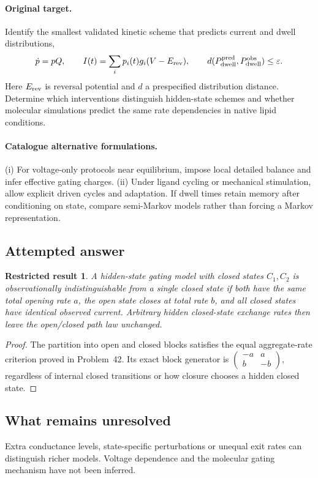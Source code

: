 \documentclass[11pt]{article}
\newtheorem{attemptresult}{Restricted result}[section]
\begin{document}
\paragraph{Original target.}
Identify the smallest validated kinetic scheme that predicts current and dwell distributions,
\[\dot p=pQ,\qquad I(t)=\sum_i p_i(t)g_i(V-E_{\rm rev}),\qquad d(P_{\rm dwell}^{\rm pred},P_{\rm dwell}^{\rm obs})\le\varepsilon.\]
Here $E_{\rm rev}$ is reversal potential and $d$ a prespecified distribution distance. Determine which interventions distinguish hidden-state schemes and whether molecular simulations predict the same rate dependencies in native lipid conditions.
\paragraph{Catalogue alternative formulations.}
(i) For voltage-only protocols near equilibrium, impose local detailed balance and infer effective gating charges. (ii) Under ligand cycling or mechanical stimulation, allow explicit driven cycles and adaptation. If dwell times retain memory after conditioning on state, compare semi-Markov models rather than forcing a Markov representation.
\subsection{Attempted answer}
\begin{attemptresult}
A hidden-state gating model with closed states $C_1,C_2$ is observationally indistinguishable from a single closed state if both have the same total opening rate $a$, the open state closes at total rate $b$, and all closed states have identical observed current. Arbitrary hidden closed-state exchange rates then leave the open/closed path law unchanged.
\end{attemptresult}
\begin{proof}
The partition into open and closed blocks satisfies the equal aggregate-rate criterion proved in Problem~42. Its exact block generator is $\left(\begin{smallmatrix}-a&a\\b&-b\end{smallmatrix}\right)$, regardless of internal closed transitions or how closure chooses a hidden closed state.
\end{proof}
\subsection{What remains unresolved}
Extra conductance levels, state-specific perturbations or unequal exit rates can distinguish richer models. Voltage dependence and the molecular gating mechanism have not been inferred.
\end{document}
